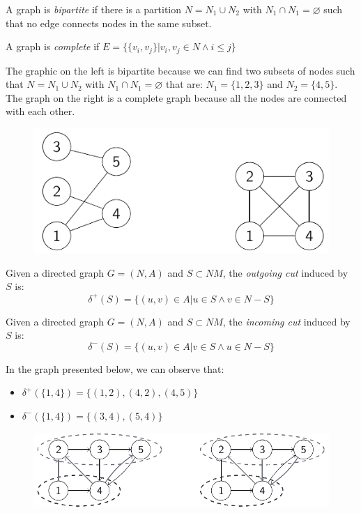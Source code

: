 \newpage
\begin{definition}
    A graph is \emph{bipartite} if there is a partition $N=N_1 \cup N_2$ with $N_1 \cap N_1 = \varnothing$ such that no edge connects nodes in the same subset. 

    A graph is \emph{complete} if $E=\{ \{v_i,v_j\} | v_i,v_j \in N \land i \leq j \}$
\end{definition}
\begin{example}
    The graphic on the left is bipartite because we can find two subsets of nodes such that $N=N_1 \cup N_2$ with $N_1 \cap N_1 = \varnothing$ that are: $N_1=\{1,2,3\}$ and $N_2=\{4,5\}$. 
    The graph on the right is a complete graph because all the nodes are connected with each other. 
    \begin{figure}[H]
        \centering
        \includegraphics[width=0.5\linewidth]{images/bipcomp.png}
    \end{figure}
\end{example}
\begin{definition}
    Given a directed graph $G=(N,A)$ and $S \subset NM$, the \emph{outgoing cut} induced by $S$ is:
    \[ \delta^{+}(S)=\{(u,v) \in A | u \in S \land v \in N-S \} \]

    Given a directed graph $G=(N,A)$ and $S \subset NM$, the \emph{incoming cut} induced by $S$ is:
    \[ \delta^{-}(S)=\{(u,v) \in A | v \in S \land u \in N-S \} \]
\end{definition}
\begin{example}
    In the graph presented below, we can observe that:
    \begin{itemize}
        \item $\delta^{+}(\{1,4\})=\{(1,2),(4,2),(4,5)\}$
        \item $\delta^{-}(\{1,4\})=\{(3,4),(5,4)\}$
    \end{itemize}
    \begin{figure}[H]
        \centering
        \includegraphics[width=0.75\linewidth]{images/cuts.png}
    \end{figure}
\end{example}
